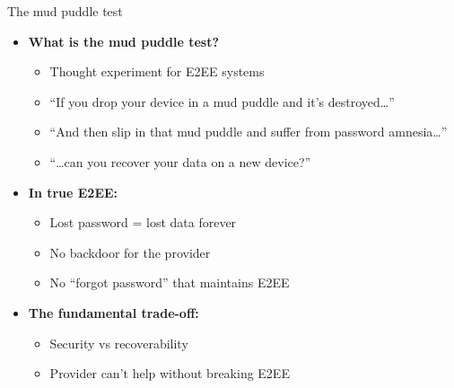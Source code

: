 \documentclass[aspectratio=169, lualatex, handout]{beamer}
\begin{document}
\begin{frame}{The mud puddle test}
	\begin{itemize}
		\item \textbf{What is the mud puddle test?}
		      \begin{itemize}
			      \item Thought experiment for E2EE systems
			      \item ``If you drop your device in a mud puddle and it's destroyed\ldots''
			      \item ``And then slip in that mud puddle and suffer from password amnesia\ldots''
			      \item ``\ldots can you recover your data on a new device?''
		      \end{itemize}
		\item \textbf{In true E2EE:}
		      \begin{itemize}
			      \item Lost password = lost data forever
			      \item No backdoor for the provider
			      \item No ``forgot password'' that maintains E2EE
		      \end{itemize}
		\item \textbf{The fundamental trade-off:}
		      \begin{itemize}
			      \item Security vs recoverability
			      \item Provider can't help without breaking E2EE
		      \end{itemize}
	\end{itemize}
\end{frame}
\end{document}
